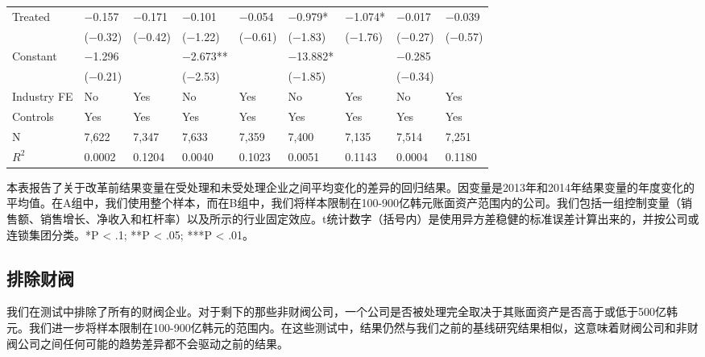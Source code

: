 \documentclass{article}
\begin{document}
\begin{table}[H]
\begin{tabularx}{\textwidth}{lXXXXXXXX}
Treated                      & −0.157          & −0.171         & −0.101        & −0.054      & −0.979*        & −1.074*       & −0.017           & −0.039         \\
                             & (−0.32)         & (−0.42)        & (−1.22)       & (−0.61)     & (−1.83)        & (−1.76)       & (−0.27)          & (−0.57)        \\
Constant                     & −1.296          &                & −2.673**      &             & −13.882*       &               & −0.285           &                \\
                             & (−0.21)         &                & (−2.53)       &             & (−1.85)        &               & (−0.34)          &                \\
Industry FE                  & No              & Yes            & No            & Yes         & No             & Yes           & No               & Yes            \\
Controls                     & Yes             & Yes            & Yes           & Yes         & Yes            & Yes           & Yes              & Yes            \\
N                            & 7,622           & 7,347          & 7,633         & 7,359       & 7,400          & 7,135         & 7,514            & 7,251          \\
$R^2$                           & 0.0002          & 0.1204         & 0.0040        & 0.1023      & 0.0051         & 0.1143        & 0.0004           & 0.1180         \\ \bottomrule
\end{tabularx}
\begin{tablenotes}
\footnotesize
    \item 本表报告了关于改革前结果变量在受处理和未受处理企业之间平均变化的差异的回归结果。因变量是2013年和2014年结果变量的年度变化的平均值。在A组中，我们使用整个样本，而在B组中，我们将样本限制在100-900亿韩元账面资产范围内的公司。我们包括一组控制变量（销售额、销售增长、净收入和杠杆率）以及所示的行业固定效应。t统计数字（括号内）是使用异方差稳健的标准误差计算出来的，并按公司或连锁集团分类。*P < .1; **P < .05; ***P < .01。
\end{tablenotes}
\end{table}

\vspace{-1cm}
\subsection{排除财阀}
\indent 我们在测试中排除了所有的财阀企业。对于剩下的那些非财阀公司，一个公司是否被处理完全取决于其账面资产是否高于或低于500亿韩元。我们进一步将样本限制在100-900亿韩元的范围内。在这些测试中，结果仍然与我们之前的基线研究结果相似，这意味着财阀公司和非财阀公司之间任何可能的趋势差异都不会驱动之前的结果。
\end{document}
